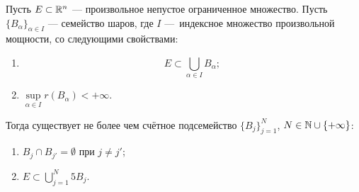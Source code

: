 \begin{lemma}
    Пусть $E \subset \mathbb{R}^n$ — произвольное непустое ограниченное множество.
    Пусть $\{B_\alpha\}_{\alpha \in I}$ — семейство шаров, где $I$ — индексное множество произвольной мощности, со следующими свойствами:
    \begin{enumerate}
        \item $$E \subset \bigcup\limits_{\alpha \in I} B_\alpha;$$
        \item $\sup\limits_{\alpha \in I} r(B_\alpha) < + \infty$.
    \end{enumerate}
    Тогда существует не более чем счётное подсемейство $\{B_j\}_{j=1}^N$, $N \in \mathbb{N} \cup \{+ \infty\}$:
    \begin{enumerate}
        \item $B_j \cap B_{j'} = \emptyset$ при $j \neq j'$;
        \item $E \subset \bigcup\limits_{j=1}^{N} 5 B_j$.
    \end{enumerate}
\end{lemma} 
